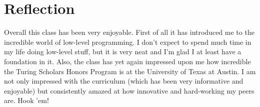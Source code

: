 \documentclass[12pt]{article}
\begin{document}
    \section{Reflection}

    Overall this class has been very enjoyable. First of all it has introduced me to the incredible world of low-level programming. I don't expect to spend much time in my life doing low-level stuff, but it is very neat and I'm glad I at least have a foundation in it. Also, the class has yet again impressed upon me how incredible the Turing Scholars Honors Program is at the University of Texas at Austin. I am not only impressed with the curriculum (which has been very informative and enjoyable) but consistently amazed at how innovative and hard-working my peers are. Hook 'em!
      
\end{document}
